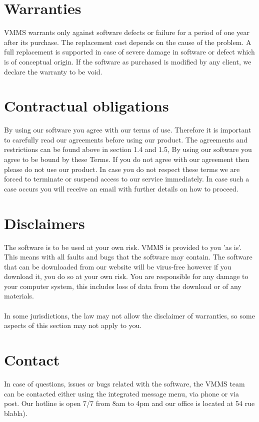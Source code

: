 \section{Warranties}
VMMS warrants only against software defects or failure for a period of one year
after its purchase. The replacement cost depends on the cause of the problem. A
full replacement is supported in case of severe damage in software or defect
which is of conceptual origin. If the software as purchased is modified by any
client, we declare the warranty to be void.

\section{Contractual obligations}

By using our software you agree with our terms of use. Therefore it is important
to carefully read our agreements before using our product. The agreements and
restrictions can be found above in section 1.4 and 1.5,  By using our software
you agree to be bound by these Terms. If you do not agree with our agreement
then  please do not use our product. In case you do not respect these terms we
are forced to terminate or suspend access to our service immediately. In case
such a case occurs you will receive an email with further details on how to
proceed.



\section{Disclaimers}
The software is to be used at your own risk. VMMS is provided to you 'as is'.
This means with all faults and bugs that the software may contain. The software
that can be downloaded from our website will be virus-free however if you
download it, you do so at your own risk. You are responsible for any damage to
your computer system, this includes loss of data from the download or of any 
materials.\\\\In some jurisdictions, the law may not allow the disclaimer of
warranties, so some aspects of this section may not apply to you.


\section{Contact}
In case of questions, issues or bugs related with the software, the VMMS team
can be contacted either using the integrated message menu, via phone or via
post. Our hotline is open 7/7 from 8am to 4pm and our office is located
at 54 rue blabla).

